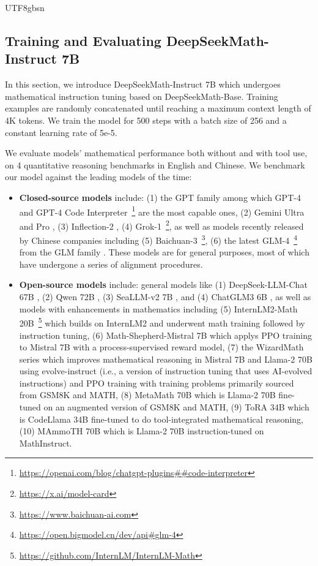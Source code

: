 \documentclass[11pt, a4paper, logo, copyright, nonumbering]{deepseek}
\newcommand{\spmath}{DeepSeekMath}
\begin{document}
\begin{CJK*}{UTF8}{gbsn}
\subsection{Training and Evaluating \spmath-Instruct 7B}

In this section, we introduce \spmath-Instruct 7B which undergoes mathematical instruction tuning based on \spmath-Base.
Training examples are randomly concatenated until reaching a maximum context length of 4K tokens.
We train the model for 500 steps with a batch size of 256 and a constant learning rate of 5e-5.

We evaluate models' mathematical performance both without and with tool use, on 4 quantitative reasoning benchmarks in English and Chinese.
We benchmark our model against the leading models of the time:
\begin{itemize}[topsep=0pt]
    \item \textbf{Closed-source models} include:
    (1) the GPT family among which GPT-4 \citep{gpt4} and GPT-4 Code Interpreter~\footnote{\url{https://openai.com/blog/chatgpt-plugins\#\#code-interpreter}} are the most capable ones,
    (2) Gemini Ultra and Pro \citep{gemini},
    (3) Inflection-2 \citep{inflection-2},
    (4) Grok-1~\footnote{\url{https://x.ai/model-card}},
    as well as models recently released by Chinese companies including
    (5) Baichuan-3~\footnote{\url{https://www.baichuan-ai.com}},
    (6) the latest GLM-4~\footnote{\url{https://open.bigmodel.cn/dev/api\#glm-4}}
    from the GLM family \citep{glm}.
    These models are for general purposes, most of which have undergone a series of alignment procedures.
    \item \textbf{Open-source models} include:
    general models like (1) DeepSeek-LLM-Chat 67B \citep{deepseek-llm}, (2) Qwen 72B \citep{qwen}, (3) SeaLLM-v2 7B \citep{seallm}, and (4) ChatGLM3 6B \citep{chatglm3},
    as well as models with enhancements in mathematics including
    (5) InternLM2-Math 20B~\footnote{\url{https://github.com/InternLM/InternLM-Math}} which builds on InternLM2 and underwent math training followed by instruction tuning,
    (6) Math-Shepherd-Mistral 7B which applys PPO training \citep{schulman2017proximal} to Mistral 7B \citep{mistral} with a process-supervised reward model,
    (7) the WizardMath series \citep{wizardmath} which improves mathematical reasoning in Mistral 7B and Llama-2 70B \citep{llama2} using evolve-instruct (i.e., a version of instruction tuning that uses AI-evolved instructions) and PPO training with training problems primarily sourced from GSM8K and MATH,
    (8) MetaMath 70B \citep{metamath} which is Llama-2 70B fine-tuned on an augmented version of GSM8K and MATH,
    (9) ToRA 34B \cite{tora} which is CodeLlama 34B fine-tuned to do tool-integrated mathematical reasoning,
    (10) MAmmoTH 70B \citep{MathInstruct} which is Llama-2 70B instruction-tuned on MathInstruct.
\end{itemize}



\end{CJK*}
\end{document}
